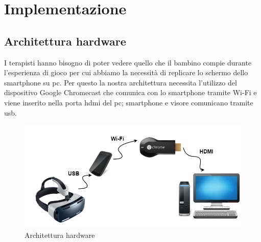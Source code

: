 \section{Implementazione} \label{sec:tecn}

\subsection{Architettura hardware} \label{subsec:hard}
I terapisti hanno bisogno di poter vedere quello che il bambino compie durante l'esperienza di gioco per cui abbiamo la necessità di replicare lo schermo dello smartphone su pc. Per questo la nostra architettura necessita l'utilizzo del dispositivo Google Chromecast che comunica con lo smartphone tramite Wi-Fi e viene inserito nella porta \acs{hdmi} del pc; smartphone e visore comunicano tramite \acs{usb}.
\vspace{70pt}
\begin{figure}[htbp]
\centering
\includegraphics[width=\textwidth]{Images/hardware}
\caption{Architettura hardware}
\label{fig:hardware}
\end{figure}
\clearpage

